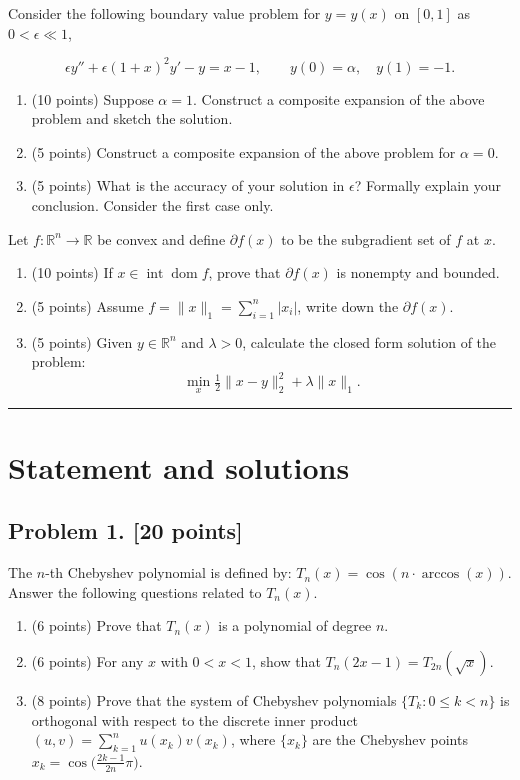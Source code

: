 \documentclass[11pt,a4paper]{article}
\newcommand{\examstatement}[1]{%
  \par\addvspace{0.85em}%
  \noindent{\bfseries #1}\par\nobreak\addvspace{0.28em}%
}
\begin{document}
\examstatement{Problem 6. [20 points]}
Consider the following boundary value problem for \(y = y(x)\) on \([0, 1]\) as \(0 < \epsilon \ll 1\),

\[
\epsilon y'' + \epsilon(1+x)^{2} y' - y = x - 1, \qquad y(0) = \alpha, \quad y(1) = -1.
\]

\begin{enumerate}[label=(\roman*)]
    \item (10 points) Suppose \(\alpha = 1\). Construct a composite expansion of the above problem and sketch the solution.
    \item (5 points) Construct a composite expansion of the above problem for \(\alpha = 0\).
    \item (5 points) What is the accuracy of your solution in \(\epsilon\)? Formally explain your conclusion. Consider the first case only.
\end{enumerate}

\examstatement{Problem 7. [20 points]}
Let \(f : \mathbb{R}^{n} \to \mathbb{R}\) be convex and define \(\partial f(x)\) to be the subgradient set of \(f\) at \(x\).
\begin{enumerate}[label=(\roman*)]
    \item (10 points) If \(x \in \operatorname{int} \operatorname{dom} f\), prove that \(\partial f(x)\) is nonempty and bounded.
    \item (5 points) Assume \(f = \|x\|_{1} = \sum_{i=1}^{n} |x_{i}|\), write down the \(\partial f(x)\).
    \item (5 points) Given \(y \in \mathbb{R}^{n}\) and \(\lambda > 0\), calculate the closed form solution of the problem:
    \[
    \min_{x} \tfrac12 \|x - y\|_{2}^{2} + \lambda \|x\|_{1}.
    \]
\end{enumerate}

\noindent\rule{\linewidth}{0.4pt}

\section{Statement and solutions}

\subsection{Problem 1. [20 points]}
The \(n\)-th Chebyshev polynomial is defined by: \(T_{n}(x) = \cos(n \cdot \arccos(x))\). Answer the following questions related to \(T_{n}(x)\).
\begin{enumerate}[label=(\roman*)]
    \item (6 points) Prove that \(T_{n}(x)\) is a polynomial of degree \(n\).
    \item (6 points) For any \(x\) with \(0 < x < 1\), show that \(T_{n}(2x - 1) = T_{2n}(\sqrt{x})\).
    \item (8 points) Prove that the system of Chebyshev polynomials \(\{T_{k} : 0 \le k < n\}\) is orthogonal with respect to the discrete inner product \((u, v) = \sum_{k=1}^{n} u(x_{k}) v(x_{k})\), where \(\{x_{k}\}\) are the Chebyshev points \(x_{k} = \cos\bigl(\frac{2k-1}{2n}\pi\bigr)\).
\end{enumerate}
\end{document}
